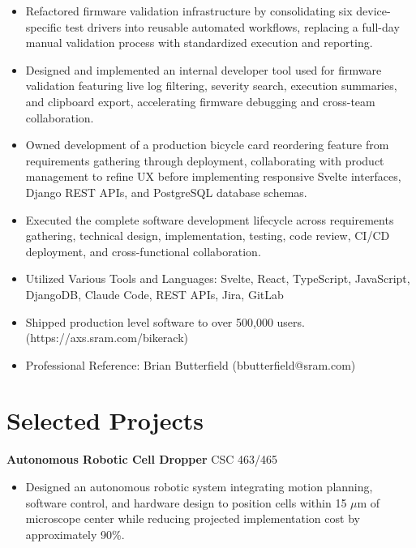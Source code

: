 \documentclass[10pt]{article}
\begin{document}
\begin{itemize}

\item Refactored firmware validation infrastructure by consolidating six device-specific test drivers into reusable automated workflows, replacing a full-day manual validation process with standardized execution and reporting.

\item Designed and implemented an internal developer tool used for firmware validation featuring live log filtering, severity search, execution summaries, and clipboard export, accelerating firmware debugging and cross-team collaboration.

\item Owned development of a production bicycle card reordering feature from requirements gathering through deployment, collaborating with product management to refine UX before implementing responsive Svelte interfaces, Django REST APIs, and PostgreSQL database schemas.

\item Executed the complete software development lifecycle across requirements gathering, technical design, implementation, testing, code review, CI/CD deployment, and cross-functional collaboration. 

\item Utilized Various Tools and Languages: Svelte, React, TypeScript, JavaScript, DjangoDB, Claude Code, REST APIs, Jira, GitLab

\item Shipped production level software to over 500,000 users. (https://axs.sram.com/bikerack)

\item Professional Reference: Brian Butterfield (bbutterfield@sram.com)

\end{itemize}

\vspace{-7pt}


\section*{Selected Projects}


\textbf{Autonomous Robotic Cell Dropper} \hfill CSC 463/465

\begin{itemize}
\item Designed an autonomous robotic system integrating motion planning, software control, and hardware design to position cells within 15 $\mu$m of microscope center while reducing projected implementation cost by approximately 90\%.
\end{itemize}
\end{document}
